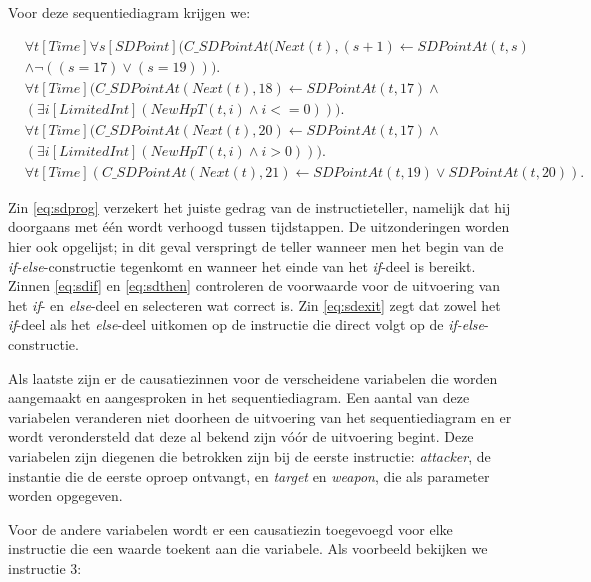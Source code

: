 Voor deze sequentiediagram krijgen we:

\begin{align}
	&\forall{t}[Time]\forall{s}[SDPoint](C\_SDPointAt(Next(t), (s+1) \leftarrow SDPointAt(t, s) \nonumber \\ &\land \lnot{}((s = 17) \lor (s = 19))). \label{eq:sdprog} \\
	&\forall{t}[Time](C\_SDPointAt(Next(t), 18) \leftarrow SDPointAt(t, 17) \land \nonumber \\ &(\exists{i}[LimitedInt](NewHpT(t, i) \land i <= 0))). \label{eq:sdif} \\
	&\forall{t}[Time](C\_SDPointAt(Next(t), 20) \leftarrow SDPointAt(t, 17 ) \land \nonumber \\ &(\exists{i}[LimitedInt](NewHpT(t, i) \land i > 0))). \label{eq:sdthen} \\
	&\forall{t}[Time](C\_SDPointAt(Next(t), 21) \leftarrow SDPointAt(t, 19) \lor SDPointAt(t, 20)). \label{eq:sdexit}
\end{align}

Zin \ref{eq:sdprog} verzekert het juiste gedrag van de instructieteller, namelijk dat hij doorgaans met \'e\'en wordt verhoogd tussen tijdstappen. De uitzonderingen worden hier ook opgelijst; in dit geval verspringt de teller wanneer men het begin van de \textit{if-else}-constructie tegenkomt en wanneer het einde van het \textit{if}-deel is bereikt. Zinnen \ref{eq:sdif} en \ref{eq:sdthen} controleren de voorwaarde voor de uitvoering van het \textit{if}- en \textit{else}-deel en selecteren wat correct is. Zin \ref{eq:sdexit} zegt dat zowel het \textit{if}-deel als het \textit{else}-deel uitkomen op de instructie die direct volgt op de \textit{if-else}-constructie.

\parbreak

Als laatste zijn er de causatiezinnen voor de verscheidene variabelen die worden aangemaakt en aangesproken in het sequentiediagram. Een aantal van deze variabelen veranderen niet doorheen de uitvoering van het sequentiediagram en er wordt verondersteld dat deze al bekend zijn v\'o\'or de uitvoering begint. Deze variabelen zijn diegenen die betrokken zijn bij de eerste instructie: \textit{attacker}, de instantie die de eerste oproep ontvangt, en \textit{target} en \textit{weapon}, die als parameter worden opgegeven.

Voor de andere variabelen wordt er een causatiezin toegevoegd voor elke instructie die een waarde toekent aan die variabele. Als voorbeeld bekijken we instructie 3:

